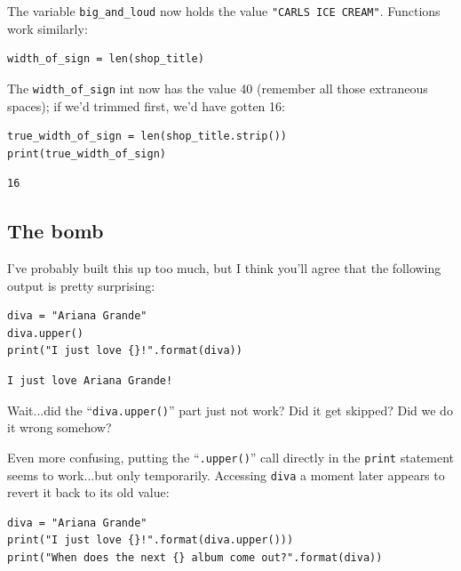 The variable \texttt{big\_and\_loud} now holds the value
\texttt{"CARL\textquotesingle S ICE CREAM"}. Functions work similarly:

\begin{Verbatim}[fontsize=\small,samepage=true,frame=single,framesep=3mm]
width_of_sign = len(shop_title)
\end{Verbatim}

The \texttt{width\_of\_sign} int now has the value 40 (remember all those
extraneous spaces); if we'd trimmed first, we'd have gotten 16:

\begin{Verbatim}[fontsize=\small,samepage=true,frame=single,framesep=3mm]
true_width_of_sign = len(shop_title.strip())
print(true_width_of_sign)
\end{Verbatim}

\begin{Verbatim}[fontsize=\small,samepage=true,frame=leftline,framesep=5mm,framerule=1mm]
16
\end{Verbatim}


\subsection{The bomb}

I've probably built this up too much, but I think you'll agree that the
following output is pretty surprising:

\begin{Verbatim}[fontsize=\small,samepage=true,frame=single,framesep=3mm]
diva = "Ariana Grande"
diva.upper()
print("I just love {}!".format(diva))
\end{Verbatim}

\begin{Verbatim}[fontsize=\small,samepage=true,frame=leftline,framesep=5mm,framerule=1mm]
I just love Ariana Grande!
\end{Verbatim}

Wait...did the ``\texttt{diva.upper()}'' part just not work? Did it get
skipped? Did we do it wrong somehow?

Even more confusing, putting the ``\texttt{.upper()}'' call directly in the
\texttt{print} statement seems to work...but only temporarily. Accessing
\texttt{diva} a moment later appears to revert it back to its old value:

\begin{Verbatim}[fontsize=\small,samepage=true,frame=single,framesep=3mm]
diva = "Ariana Grande"
print("I just love {}!".format(diva.upper()))
print("When does the next {} album come out?".format(diva))
\end{Verbatim}

